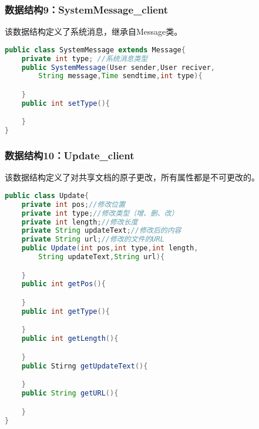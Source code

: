 \subsubsection{数据结构9：SystemMessage\_client}
该数据结构定义了系统消息，继承自Message类。
\begin{lstlisting}[language=Java, caption=SystemMessage定义]
public class SystemMessage extends Message{
    private int type; //系统消息类型
    public SystemMessage(User sender,User reciver,
        String message,Time sendtime,int type){

    } 
    public int setType(){

    }
}
\end{lstlisting}

\subsubsection{数据结构10：Update\_client}
该数据结构定义了对共享文档的原子更改，所有属性都是不可更改的。
\begin{lstlisting}[language=Java, caption=Update定义]
public class Update{
    private int pos;//修改位置
    private int type;//修改类型（增、删、改）
    private int length;//修改长度
    private String updateText;//修改后的内容
    private String url;//修改的文件的URL
    public Update(int pos,int type,int length,
        String updateText,String url){

    }
    public int getPos(){

    }
    public int getType(){

    }
    public int getLength(){

    }
    public Stirng getUpdateText(){

    }
    public String getURL(){

    }
}
\end{lstlisting}

